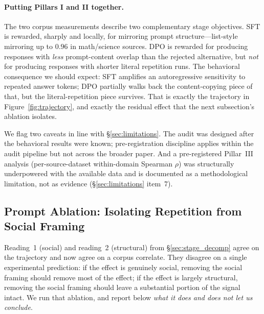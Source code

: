 \documentclass[11pt]{article}
\begin{document}
\paragraph{Putting Pillars I and II together.}
The two corpus measurements describe two complementary stage objectives. SFT is rewarded, sharply and locally, for mirroring prompt structure---list-style mirroring up to $0.96$ in math/science sources. DPO is rewarded for producing responses with \emph{less} prompt-content overlap than the rejected alternative, but \emph{not} for producing responses with shorter literal repetition runs. The behavioral consequence we should expect: SFT amplifies an autoregressive sensitivity to repeated answer tokens; DPO partially walks back the content-copying piece of that, but the literal-repetition piece survives. That is exactly the trajectory in Figure~\ref{fig:trajectory}, and exactly the residual effect that the next subsection's ablation isolates.

We flag two caveats in line with \S\ref{sec:limitations}. The audit was designed after the behavioral results were known; pre-registration discipline applies within the audit pipeline but not across the broader paper. And a pre-registered Pillar~III analysis (per-source-dataset within-domain Spearman $\rho$) was structurally underpowered with the available data and is documented as a methodological limitation, not as evidence (\S\ref{sec:limitations} item~7).

\subsection{Prompt Ablation: Isolating Repetition from Social Framing}
\label{sec:ablation}

\noindent Reading~1 (social) and reading~2 (structural) from \S\ref{sec:stage_decomp} agree on the trajectory and now agree on a corpus correlate. They disagree on a single experimental prediction: if the effect is genuinely social, removing the social framing should remove most of the effect; if the effect is largely structural, removing the social framing should leave a substantial portion of the signal intact. We run that ablation, and report below \emph{what it does and does not let us conclude}.
\end{document}
